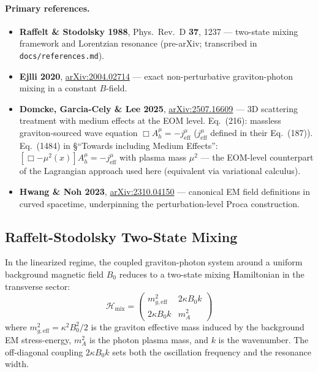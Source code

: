 \paragraph{Primary references.}
\begin{itemize}
  \item \textbf{Raffelt \& Stodolsky 1988}, Phys.\ Rev.\ D \textbf{37}, 1237 ---
    two-state mixing framework and Lorentzian resonance (pre-arXiv;
    transcribed in \texttt{docs/references.md}).
  \item \textbf{Ejlli 2020}, \href{https://arxiv.org/abs/2004.02714}{arXiv:2004.02714} ---
    exact non-perturbative graviton-photon mixing in a constant $B$-field.
  \item \textbf{Domcke, Garcia-Cely \& Lee 2025},
    \href{https://arxiv.org/abs/2507.16609}{arXiv:2507.16609} ---
    3D scattering treatment with medium effects at the EOM level.
    Eq.~(216): massless graviton-sourced wave equation
    $\Box A_h^\mu = -j_{\mathrm{eff}}^\mu$ ($j_{\mathrm{eff}}^\mu$ defined
    in their Eq.~(187)). Eq.~(1484) in \S``Towards including Medium
    Effects'': $[\Box - \mu^2(x)]A_h^\mu = -j_{\mathrm{eff}}^\mu$ with
    plasma mass $\mu^2$ --- the EOM-level counterpart of the Lagrangian
    approach used here (equivalent via variational calculus).
  \item \textbf{Hwang \& Noh 2023},
    \href{https://arxiv.org/abs/2310.04150}{arXiv:2310.04150} ---
    canonical EM field definitions in curved spacetime, underpinning
    the perturbation-level Proca construction.
\end{itemize}

\subsection{Raffelt-Stodolsky Two-State Mixing}
\label{subsec:raffelt-stodolsky}

In the linearized regime, the coupled graviton-photon system around a
uniform background magnetic field $B_0$ reduces to a two-state mixing
Hamiltonian in the transverse sector:
\begin{equation}
  \mathcal{H}_{\mathrm{mix}} = \begin{pmatrix}
    m_{g,\mathrm{eff}}^2 & 2\kappa B_0 k \\
    2\kappa B_0 k & m_A^2
  \end{pmatrix}
  \label{eq:mixing-hamiltonian}
\end{equation}
where $m_{g,\mathrm{eff}}^2 = \kappa^2 B_0^2 / 2$ is the graviton effective
mass induced by the background EM stress-energy, $m_A^2$ is the photon
plasma mass, and $k$ is the wavenumber. The off-diagonal coupling
$2\kappa B_0 k$ sets both the oscillation frequency and the resonance
width.

